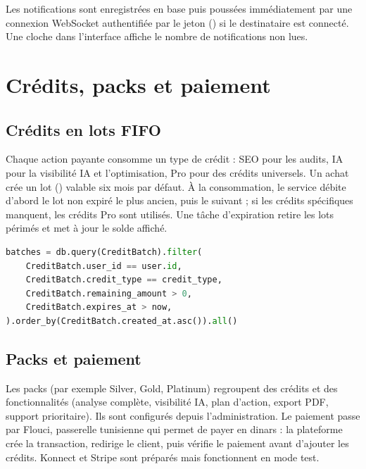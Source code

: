 
Les notifications sont enregistrées en base puis poussées immédiatement par une connexion WebSocket authentifiée par le jeton () si le destinataire est connecté. Une cloche dans l'interface affiche le nombre de notifications non lues.

\section{Crédits, packs et paiement}
\subsection{Crédits en lots FIFO}
Chaque action payante consomme un type de crédit : SEO pour les audits, IA pour la visibilité IA et l'optimisation, Pro pour des crédits universels. Un achat crée un lot () valable six mois par défaut. À la consommation, le service débite d'abord le lot non expiré le plus ancien, puis le suivant ; si les crédits spécifiques manquent, les crédits Pro sont utilisés. Une tâche d'expiration retire les lots périmés et met à jour le solde affiché.

\begin{lstlisting}[language=Python,caption={Sélection des lots à débiter (extrait simplifié)},label={lst-fifo}]
batches = db.query(CreditBatch).filter(
    CreditBatch.user_id == user.id,
    CreditBatch.credit_type == credit_type,
    CreditBatch.remaining_amount > 0,
    CreditBatch.expires_at > now,
).order_by(CreditBatch.created_at.asc()).all()
\end{lstlisting}

\subsection{Packs et paiement}
Les packs (par exemple Silver, Gold, Platinum) regroupent des crédits et des fonctionnalités (analyse complète, visibilité IA, plan d'action, export PDF, support prioritaire). Ils sont configurés depuis l'administration. Le paiement passe par Flouci, passerelle tunisienne qui permet de payer en dinars : la plateforme crée la transaction, redirige le client, puis vérifie le paiement avant d'ajouter les crédits. Konnect et Stripe sont préparés mais fonctionnent en mode test. 

